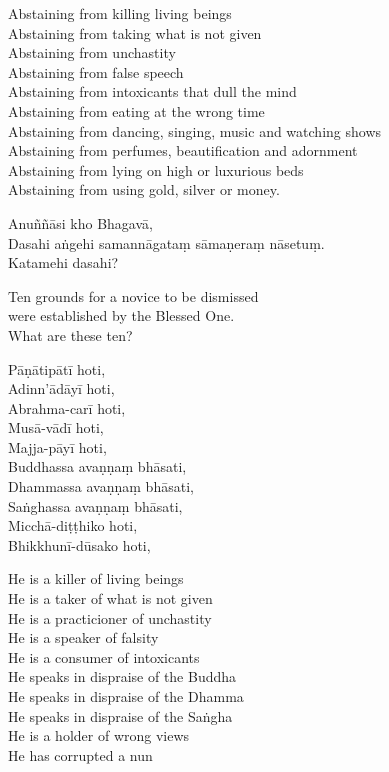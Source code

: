 \begin{english}
  Abstaining from killing living beings\\
  Abstaining from taking what is not given\\
  Abstaining from unchastity\\
  Abstaining from false speech\\
  Abstaining from intoxicants that dull the mind\\
  Abstaining from eating at the wrong time\\
  Abstaining from dancing, singing, music and watching shows\\
  Abstaining from perfumes, beautification and adornment\\
  Abstaining from lying on high or luxurious beds\\
  Abstaining from using gold, silver or money.
\end{english}


Anuññāsi kho Bhagavā,\\
Dasahi aṅgehi samannāgataṃ sāmaṇeraṃ nāsetuṃ.\\
Katamehi dasahi?

\begin{english}
  Ten grounds for a novice to be dismissed\\
  were established by the Blessed One.\\
  What are these ten?
\end{english}

Pāṇātipātī hoti,\\
Adinn'ādāyī hoti,\\
Abrahma-carī hoti,\\
Musā-vādī hoti,\\
Majja-pāyī hoti,\\
Buddhassa avaṇṇaṃ bhāsati,\\
Dhammassa avaṇṇaṃ bhāsati,\\
Saṅghassa avaṇṇaṃ bhāsati,\\
Micchā-diṭṭhiko hoti,\\
Bhikkhunī-dūsako hoti,

\begin{english}
  He is a killer of living beings\\
  He is a taker of what is not given\\
  He is a practicioner of unchastity\\
  He is a speaker of falsity\\
  He is a consumer of intoxicants\\
  He speaks in dispraise of the Buddha\\
  He speaks in dispraise of the Dhamma\\
  He speaks in dispraise of the Saṅgha\\
  He is a holder of wrong views\\
  He has corrupted a nun
\end{english}

